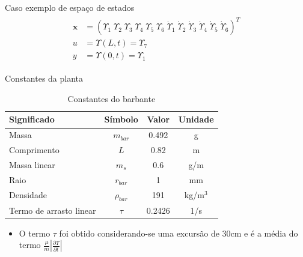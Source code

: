\documentclass[10pt]{beamer}
\begin{document}
\begin{frame}[fragile]{Caso exemplo de espaço de estados}
	\begin{align}
	\begin{array}{ll}
\mathbf{x} &= \left(\Upsilon_1\;\Upsilon_2\;\Upsilon_3\;\Upsilon_4\;\Upsilon_5\;\Upsilon_6\;\dot{\Upsilon}_1\;\dot{\Upsilon}_2\;\dot{\Upsilon}_3\;\dot{\Upsilon}_4\;\dot{\Upsilon}_5\;\dot{\Upsilon}_6\right)^T\\
u &= \Upsilon(L,t) = \Upsilon_7\\
y &= \Upsilon(0,t) = \Upsilon_1
\end{array}
 \end{align} 
\end{frame}


\begin{frame}[fragile]{Constantes da planta}

\begin{block}{}
\begin{table}[!ht]
	\centering
	\caption{Constantes do barbante\label{constanteBarbante}}
	\begin{tabular}{|l|c|c|c|}
		\hline
		\textbf{Significado} & \textbf{Símbolo} & \textbf{Valor} & \textbf{Unidade}\\ \hline \hline
		Massa & $m_{bar}$ & 0.492 & g\\ \hline
		Comprimento & $L$ & 0.82 & m \\ \hline
		Massa linear & $m_s$ & 0.6 & g/m\\ \hline
		Raio & $r_{bar}$ & 1 & mm\\ \hline
		Densidade & $\rho_{bar}$ & 191 & kg/m$^3$\\ \hline
		Termo de arrasto linear & $\tau$ & 0.2426 & 1/s\\ \hline
	\end{tabular}
	
\end{table}

\end{block}

\begin{block}{}
\begin{itemize}
	\item O termo $\tau$ foi obtido considerando-se uma excursão de 30cm e é a média do termo $\frac{\mu}{m}\left|\frac{\partial \Upsilon}{\partial t}\right|$
\end{itemize}	
\end{block}


\end{frame}
\end{document}
